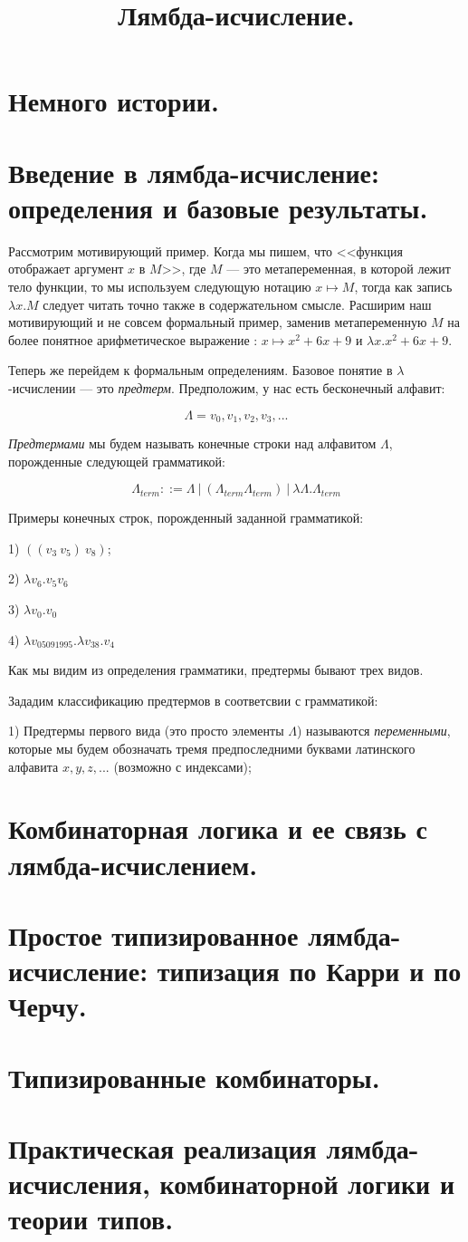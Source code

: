 \documentclass[a4paper]{article}
\begin{document}
\title{Лямбда-исчисление.}
\section{Немного истории.}
\section{Введение в лямбда-исчисление: определения и базовые результаты.}

Рассмотрим мотивирующий пример. Когда мы пишем, что <<функция отображает аргумент $x$ в $M$>>, где $M$ --- это метапеременная,
в которой лежит тело функции, то мы используем следующую нотацию $x \mapsto M$, тогда как запись $\lambda x.M$ следует читать точно
также в содержательном смысле. Расширим наш мотивирующий и не совсем формальный пример,
заменив метапеременную $M$ на более понятное арифметическое выражение : $x \mapsto x^2 + 6x + 9$ и $\lambda x.x^2 + 6x + 9$.

Теперь же перейдем к формальным определениям. Базовое понятие в $\lambda$-исчислении --- это \emph{предтерм}. Предположим, у нас есть бесконечный алфавит:

\begin{equation}
\Lambda = {v_0, v_1, v_2, v_3, ... }
\end{equation}

\emph{Предтермами} мы будем называть конечные строки над алфавитом $\Lambda$, порожденные следующей грамматикой:

\begin{equation}
\Lambda_{term} ::= \Lambda \: | \: (\Lambda_{term} \Lambda_{term}) \: | \: \lambda \Lambda . \Lambda_{term}
\end{equation}

Примеры конечных строк, порожденный заданной грамматикой:

1) $((v_3 \: v_5) \: v_8)$;

2) $\lambda v_6. v_5 v_6$

3) $\lambda v_0. v_0$

4) $\lambda v_{05091995}.\lambda v_{38}.v_{4}$

Как мы видим из определения грамматики, предтермы бывают трех видов.

Зададим классификацию предтермов в соответсвии с грамматикой:

1) Предтермы первого вида (это просто элементы $\Lambda$) называются \emph{переменными}, которые мы будем обозначать тремя предпоследними буквами
латинского алфавита $x, y, z, ...$ (возможно с индексами);



\section{Комбинаторная логика и ее связь с лямбда-исчислением.}
\section{Простое типизированное лямбда-исчисление: типизация по Карри и по Черчу.}
\section{Типизированные комбинаторы.}
\section{Практическая реализация лямбда-исчисления, комбинаторной логики и теории типов.}
\end{document}
